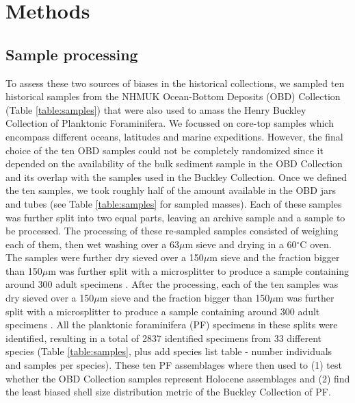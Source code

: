 \documentclass[a4paper]{article}
\begin{document}

\section{Methods}
\label{sec:methods}

\subsection{Sample processing}

To assess these two sources of biases in the historical collections, we sampled ten historical samples from the NHMUK Ocean-Bottom Deposits (OBD) Collection (Table \ref{table:samples}) that were also used to amass the Henry Buckley Collection of Planktonic Foraminifera. We focussed on core-top samples which encompass different oceans, latitudes and marine expeditions. However, the final choice of the ten OBD samples could not be completely randomized since it depended on the availability of the bulk sediment sample in the OBD Collection and its overlap with the samples used in the Buckley Collection. 
Once we defined the ten samples, we took roughly half of the amount available in the OBD jars and tubes (see Table \ref{table:samples} for sampled masses). Each of these samples was further split into two equal parts, leaving an archive sample and a sample to be processed. The processing of these re-sampled samples consisted of weighing each of them, then wet washing over a 63$\mu$m sieve and drying in a 60$^{\circ}$C oven. The samples were further dry sieved over a 150$\mu$m sieve and the fraction bigger than 150$\mu$m was further split with a microsplitter to produce a sample containing around 300 adult specimens \citep{alsabouni2007vertical}. After the processing, each of the ten samples was dry sieved over a 150$\mu$m sieve and the fraction bigger than 150$\mu$m was further split with a microsplitter to produce a sample containing around 300 adult specimens \citep{alsabouni2007vertical}. All the planktonic foraminifera (PF) specimens in these splits were identified, resulting in a total of 2837 identified specimens from 33 different species (Table \ref{table:samples}, plus add species list table - number individuals and samples per species). 
These ten PF assemblages where then used to (1) test whether the OBD Collection samples represent Holocene assemblages and (2) find the least biased shell size distribution metric of the Buckley Collection of PF.
\end{document}
